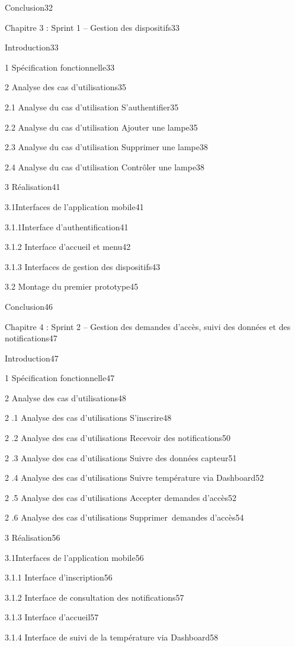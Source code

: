 \documentclass{article}
\begin{document}
Conclusion32

Chapitre 3 : Sprint 1 – Gestion  des dispositifs33

Introduction33

1 Spécification fonctionnelle33

2 Analyse des cas d’utilisations35

2.1 Analyse du cas d’utilisation S’authentifier35

2.2 Analyse du cas d’utilisation Ajouter une lampe35

2.3 Analyse du cas d’utilisation Supprimer une lampe38

2.4 Analyse du cas d’utilisation Contrôler une lampe38

3 Réalisation41

3.1Interfaces de l’application mobile41

3.1.1Interface d’authentification41

3.1.2 Interface d’accueil  et  menu42

3.1.3 Interfaces de gestion des dispositifs43

3.2 Montage du premier prototype45

Conclusion46

Chapitre 4 : Sprint 2 – Gestion des demandes d’accès, suivi des données et des notifications47

Introduction47

1 Spécification fonctionnelle47

2 Analyse des cas d’utilisations48

2 .1 Analyse des cas d’utilisations S’inscrire48

2 .2 Analyse des cas d’utilisations Recevoir des notifications50

2 .3 Analyse des cas d’utilisations Suivre des données capteur51

2 .4 Analyse des cas d’utilisations Suivre température via Dashboard52

2 .5 Analyse des cas d’utilisations Accepter demandes d’accès52

2 .6 Analyse des cas d’utilisations Supprimer demandes d’accès54

3 Réalisation56

3.1Interfaces de l’application mobile56

3.1.1 Interface d’inscription56

3.1.2 Interface de consultation des notifications57

3.1.3 Interface d’accueil57

3.1.4 Interface de suivi de la température via Dashboard58
\end{document}

